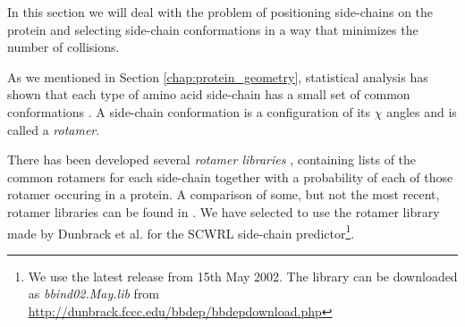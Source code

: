 In this section we will deal with the problem of positioning side-chains
on the protein and selecting side-chain conformations in a way that
minimizes the number of collisions.

As we mentioned in Section \ref{chap:protein_geometry}, statistical
analysis has shown that each type of amino acid side-chain has a small
set of common conformations \cite{dunbrack2002rotamer}. A side-chain
conformation is a configuration of its $\chi$ angles and is called a
\textit{rotamer}.

There has been developed several \textit{rotamer libraries}
\cite{dunbrack1997bayesian, lovell2000penultimate}, containing lists
of the common rotamers for each side-chain together with a probability
of each of those rotamer occuring in a protein. A comparison of some,
but not the most recent, rotamer libraries can be found in
\cite{dunbrack2002rotamer}. We have selected to use the rotamer
library made by Dunbrack et al. for the SCWRL side-chain
predictor\footnote{We use the latest release from 15th May 2002. The
  library can be downloaded as \textit{bbind02.May.lib} from
  \url{http://dunbrack.fccc.edu/bbdep/bbdepdownload.php}}.

